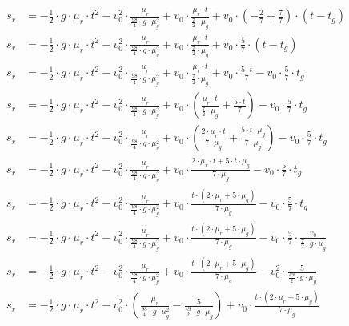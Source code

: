 \begin{align}
    s_r &= - \frac{1}{2} \cdot g \cdot \mu_r \cdot t^2 - v_0^2 \cdot \frac{\mu_r}{\frac{98}{4} \cdot g \cdot \mu_g^2} + v_0 \cdot \frac{\mu_r \cdot t}{\frac{7}{2} \cdot \mu_g} + v_0 \cdot (-\frac{2}{7} + \frac{7}{7}) \cdot (t - t_g)\\
    s_r &= - \frac{1}{2} \cdot g \cdot \mu_r \cdot t^2 - v_0^2 \cdot \frac{\mu_r}{\frac{98}{4} \cdot g \cdot \mu_g^2} + v_0 \cdot \frac{\mu_r \cdot t}{\frac{7}{2} \cdot \mu_g} + v_0 \cdot \frac{5}{7} \cdot (t - t_g)\\
    s_r &= - \frac{1}{2} \cdot g \cdot \mu_r \cdot t^2 - v_0^2 \cdot \frac{\mu_r}{\frac{98}{4} \cdot g \cdot \mu_g^2} + v_0 \cdot \frac{\mu_r \cdot t}{\frac{7}{2} \cdot \mu_g} + v_0 \cdot \frac{5 \cdot t}{7} - v_0 \cdot \frac{5}{7} \cdot t_g\\
    s_r &= - \frac{1}{2} \cdot g \cdot \mu_r \cdot t^2 - v_0^2 \cdot \frac{\mu_r}{\frac{98}{4} \cdot g \cdot \mu_g^2} + v_0 \cdot (\frac{\mu_r \cdot t}{\frac{7}{2} \cdot \mu_g} + \frac{5 \cdot t}{7}) - v_0 \cdot \frac{5}{7} \cdot t_g\\
    s_r &= - \frac{1}{2} \cdot g \cdot \mu_r \cdot t^2 - v_0^2 \cdot \frac{\mu_r}{\frac{98}{4} \cdot g \cdot \mu_g^2} + v_0 \cdot (\frac{2 \cdot \mu_r \cdot t}{7 \cdot \mu_g} + \frac{5 \cdot t \cdot \mu_g}{7 \cdot \mu_g}) - v_0 \cdot \frac{5}{7} \cdot t_g\\
    s_r &= - \frac{1}{2} \cdot g \cdot \mu_r \cdot t^2 - v_0^2 \cdot \frac{\mu_r}{\frac{98}{4} \cdot g \cdot \mu_g^2} + v_0 \cdot \frac{2 \cdot \mu_r \cdot t + 5 \cdot t \cdot \mu_g}{7 \cdot \mu_g} - v_0 \cdot \frac{5}{7} \cdot t_g\\
    s_r &= - \frac{1}{2} \cdot g \cdot \mu_r \cdot t^2 - v_0^2 \cdot \frac{\mu_r}{\frac{98}{4} \cdot g \cdot \mu_g^2} + v_0 \cdot \frac{t \cdot (2 \cdot \mu_r + 5 \cdot \mu_g)}{7 \cdot \mu_g} - v_0 \cdot \frac{5}{7} \cdot t_g\\
    s_r &= - \frac{1}{2} \cdot g \cdot \mu_r \cdot t^2 - v_0^2 \cdot \frac{\mu_r}{\frac{98}{4} \cdot g \cdot \mu_g^2} + v_0 \cdot \frac{t \cdot (2 \cdot \mu_r + 5 \cdot \mu_g)}{7 \cdot \mu_g} - v_0 \cdot \frac{5}{7} \cdot \frac{v_0}{\frac{7}{2} \cdot g \cdot \mu_g}\\
    s_r &= - \frac{1}{2} \cdot g \cdot \mu_r \cdot t^2 - v_0^2 \cdot \frac{\mu_r}{\frac{98}{4} \cdot g \cdot \mu_g^2} + v_0 \cdot \frac{t \cdot (2 \cdot \mu_r + 5 \cdot \mu_g)}{7 \cdot \mu_g} - v_0^2 \cdot \frac{5}{\frac{49}{2} \cdot g \cdot \mu_g}\\
    s_r &= - \frac{1}{2} \cdot g \cdot \mu_r \cdot t^2 - v_0^2 \cdot (\frac{\mu_r}{\frac{98}{4} \cdot g \cdot \mu_g^2} - \frac{5}{\frac{49}{2} \cdot g \cdot \mu_g}) + v_0 \cdot \frac{t \cdot (2 \cdot \mu_r + 5 \cdot \mu_g)}{7 \cdot \mu_g}\\

\end{align}
